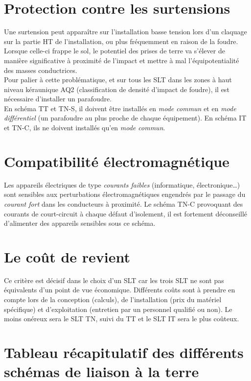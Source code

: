\section{Protection contre les surtensions}

Une surtension peut apparaître sur l'installation basse tension lors d'un claquage sur la partie HT de l'installation, ou plus fréquemment en raison de la foudre. Lorsque celle-ci frappe le sol, le potentiel des prises de terre va s'élever de manière significative à proximité de l'impact et mettre à mal l'équipotentialité des masses conductrices.\\
Pour palier à cette problématique, et sur tous les SLT dans les zones à haut niveau kéraunique AQ2 (classification de densité d'impact de foudre), il est nécessaire d'installer un parafoudre.\\
En schéma TT et TN-S, il doivent être installés en \emph{mode commun} et en \emph{mode différentiel} (un parafoudre au plus proche de chaque équipement). En schéma IT et TN-C, ils ne doivent installés qu'en \emph{mode commun}.

\section{Compatibilité électromagnétique}

Les appareils électriques de type \emph{courants faibles} (informatique, électronique\ldots) sont sensibles aux perturbations électromagnétiques engendrés par le passage du \emph{courant fort} dans les conducteurs à proximité. Le schéma TN-C provoquant des courants de court-circuit à chaque défaut d'isolement, il est fortement déconseillé d'alimenter des appareils sensibles sous ce schéma.

\section{Le coût de revient}

Ce critère est décisif dans le choix d'un SLT car les trois SLT ne sont pas équivalents d'un point de vue économique. Différents coûts sont à prendre en compte lors de la conception (calculs), de l'installation (prix du matériel spécifique) et d'exploitation (entretien par un personnel qualifié ou non). Le moins onéreux sera le SLT TN, suivi du TT et le SLT IT sera le plus coûteux.

\section{Tableau récapitulatif des différents schémas de liaison à la terre}



%
